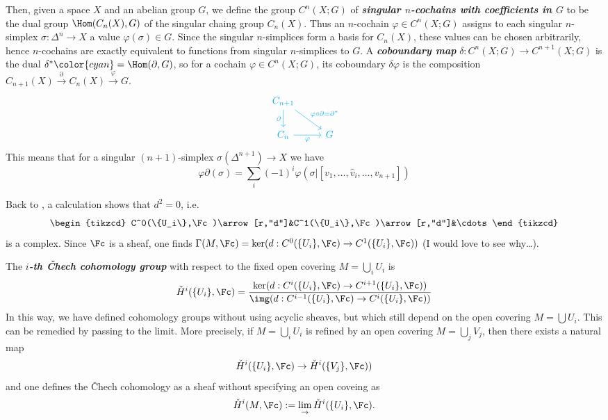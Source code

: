 \begin{remark}
	Then, given a space $X$ and an abelian group $G$, we define the group $C^n(X;G)$ of \textbf{\textit{singular $n$-cochains with coefficients in $G$}} to be the dual group $\Hom(C_n(X),G)$ of the singular chaing group $C_n(X)$. Thus an $n$-cochain $\varphi\in C^n(X;G)$ assigns to each singular $n$-simplex $\sigma:\Delta^n\to X$ a value $\varphi(\sigma)\in G$. Since the singular $n$-simplices form a basis for $C_n(X)$, these values can be chosen arbitrarily, hence $n$-cochains are exactly equivalent to functions from singular $n$-simplices to $G$. A \textbf{\textit{coboundary map}} $\delta:C^n(X;G)\to C^{n+1}(X;G)$ is the dual $\delta^*{\color{cyan}=\Hom(\partial,G)}$, so for a cochain $\varphi\in C^n(X;G)$, its coboundary $\delta\varphi$ is the composition $C_{n+1}(X)\overset{\partial}{\to}C_n(X)\overset{\varphi}{\to}G$.
		\[\begin{tikzcd}
		\textcolor{cyan}{C_{n+1}}\arrow[d,cyan,swap,"\partial"]\arrow[rd,cyan,"\varphi\circ\partial=\partial^*"]\\	\textcolor{cyan}{C_n}\arrow[cyan,swap,r,"\varphi"]&\textcolor{cyan}{G}
	\end{tikzcd}\]
	This means that for a singular $(n+1)$-simplex $\sigma(\Delta^{n+1})\to X$ we have
	\[\varphi\partial (\sigma)=\sum_i(-1)^i\varphi(\sigma|[v_1,\ldots,\widehat{v}_i,\ldots,v_{n+1}])\]
\end{remark}

Back to \cite{huybrechts}, a calculation shows that $d^2=0$, i.e.
\[\begin{tikzcd}
	C^0(\{U_i\},\Fc)\arrow[r,"d"]&C^1(\{U_i\},\Fc)\arrow[r,"d"]&\cdots
\end{tikzcd}\]
is a complex. {\color{magenta}Since $\Fc$ is a sheaf, one finds $\Gamma(M,\Fc)=\ker(d:C^0(\{U_i\},\Fc)\to C^1(\{U_i\},\Fc))$ (I would love to see why…)}.

\begin{defn}
	The \textbf{\textit{$i$-th \v Chech cohomology group}} with respect to the fixed open covering $M=\bigcup_iU_i$ is
	\[\check{H}^i(\{U_i\},\Fc)=\dfrac{\ker(d:C^i(\{U_i\},\Fc)\to C^{i+1}(\{U_i\},\Fc))}{\img(d:C^{i-1}(\{U_i\},\Fc)\to C^i(\{U_i\},\Fc))}\]
	In this way, we have defined cohomology groups without using acyclic sheaves, but which still depend on the open covering $M=\bigcup U_i$. This can be remedied by passing to the limit. More precisely, if $M=\bigcup_i U_i$ is refined by an open covering $M=\bigcup_jV_j$, then there exists a natural map
	\[\check{H}^i(\{U_i\},\Fc)\to\check{H}^i(\{V_j\},\Fc))\]
	and one defines the \v Chech cohomology as a sheaf without specifying an open coveing as
	\[\check{H}^i(M,\Fc):=\lim_\to \check{H}^i(\{U_i\},\Fc).\]
\end{defn}

